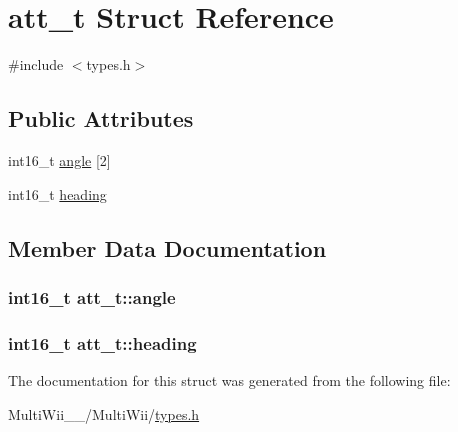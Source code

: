 \hypertarget{structatt__t}{\section{att\-\_\-t Struct Reference}
\label{structatt__t}
}


{\ttfamily \#include $<$types.\-h$>$}

\subsection*{Public Attributes}
\begin{DoxyCompactItemize}
\item 
int16\-\_\-t \hyperlink{structatt__t_ae2ba896868bb22c843564aa8f2cc0cde}{angle} \mbox{[}2\mbox{]}
\item 
int16\-\_\-t \hyperlink{structatt__t_a0ca28f5519397aaa62a14c3896e7b04d}{heading}
\end{DoxyCompactItemize}


\subsection{Member Data Documentation}
\hypertarget{structatt__t_ae2ba896868bb22c843564aa8f2cc0cde}{
\subsubsection[{angle}]{\setlength{\rightskip}{0pt plus 5cm}int16\-\_\-t att\-\_\-t\-::angle}}\label{structatt__t_ae2ba896868bb22c843564aa8f2cc0cde}
\hypertarget{structatt__t_a0ca28f5519397aaa62a14c3896e7b04d}{
\subsubsection[{heading}]{\setlength{\rightskip}{0pt plus 5cm}int16\-\_\-t att\-\_\-t\-::heading}}\label{structatt__t_a0ca28f5519397aaa62a14c3896e7b04d}


The documentation for this struct was generated from the following file\-:\begin{DoxyCompactItemize}
\item 
Multi\-Wii\-\_\-\_/\-Multi\-Wii/\hyperlink{MultiWii__2__4_2MultiWii_2types_8h}{types.\-h}\end{DoxyCompactItemize}
